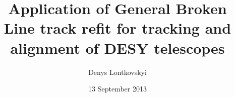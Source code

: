 \documentclass[a4paper,10pt]{article}
\title{Application of General Broken Line track refit for tracking and alignment of DESY telescopes}
\author{Denys Lontkovskyi}
\date{13 September 2013}
\begin{document}
\maketitle

\begin{abstract}

\end{abstract}


\end{document}
